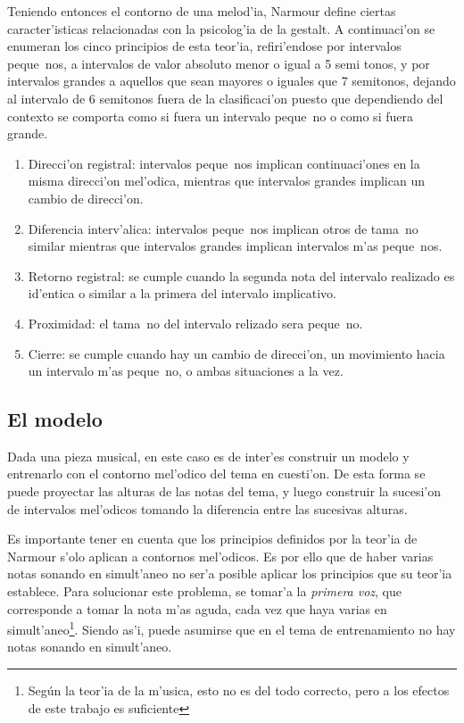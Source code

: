Teniendo entonces el contorno de una melod'ia, Narmour define ciertas caracter'isticas relacionadas con la psicolog'ia de la gestalt. A continuaci'on 
se enumeran los cinco principios de esta teor'ia, refiri'endose por intervalos peque~nos, a intervalos de valor absoluto menor o igual a 5 semi tonos, y por intervalos
grandes a aquellos que sean mayores o iguales que 7 semitonos, dejando al intervalo de 6 semitonos fuera de la clasificaci'on puesto que dependiendo del contexto
se comporta como si fuera un intervalo peque~no o como si fuera grande.
\begin{enumerate}
 \item Direcci'on registral: intervalos peque~nos implican continuaci'ones en la misma direcci'on mel'odica, mientras que intervalos grandes implican un cambio de direcci'on.
 \item Diferencia interv'alica: intervalos peque~nos implican otros de tama~no similar mientras que intervalos grandes implican intervalos m'as peque~nos. 
 \item Retorno registral: se cumple cuando la segunda nota del intervalo realizado es id'entica o similar a la primera del intervalo implicativo.
 \item Proximidad: el tama~no del intervalo relizado sera peque~no.
 \item Cierre: se cumple cuando hay un cambio de direcci'on, un movimiento hacia un intervalo m'as peque~no, o ambas situaciones a la vez.
\end{enumerate}

\subsection{El modelo}
\label{sec:contour_model}
Dada una pieza musical, en este caso es de inter'es construir un modelo y entrenarlo con el contorno mel'odico del tema en cuesti'on. De esta forma se puede proyectar
las alturas de las notas del tema, y luego construir la sucesi'on de intervalos mel'odicos tomando la diferencia entre las sucesivas alturas. 

Es importante tener en cuenta que los principios definidos por la teor'ia de Narmour s'olo aplican a contornos mel'odicos. 
Es por ello que de haber varias notas sonando en simult'aneo no ser'a posible aplicar los principios que su teor'ia establece. 
Para solucionar este problema, se tomar'a la \emph{primera voz}, que corresponde a tomar la nota m'as aguda, cada vez que haya varias en simult'aneo\footnote{Seg\'un
la teor'ia de la m'usica, esto no es del todo correcto, pero a los efectos de este trabajo es suficiente}. 
Siendo as'i, puede asumirse que en el tema de entrenamiento no hay notas sonando en simult'aneo. 


